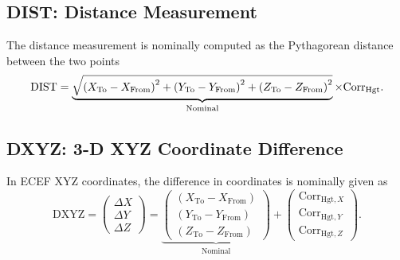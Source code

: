\subsection{DIST: Distance Measurement} \label{subsection:DIST}
The distance measurement is nominally computed as the Pythagorean distance between the two points
\begin{equation}
\text{DIST} = \underbrace{\sqrt{\left(X_{\text{To}}-X_{\text{From}}\right)^2+\left(Y_{\text{To}}-Y_{\text{From}}\right)^2+\left(Z_{\text{To}}-Z_{\text{From}}\right)^2}}_{\text{Nominal}}\times\text{Corr}_{\text{\text{Hgt}}}.
\end{equation}
\subsection{DXYZ: 3-D XYZ Coordinate Difference} \label{subsection:DXYZ}
In ECEF XYZ coordinates, the difference in coordinates is nominally given as
\begin{equation}
\text{DXYZ}=\left(\begin{array}{c}\Delta X\\\Delta Y\\\Delta Z\end{array}\right) = \underbrace{\left(\begin{array}{c}\left(X_{\text{To}}-X_{\text{From}}\right)\\\left(Y_{\text{To}}-Y_{\text{From}}\right)\\\left(Z_{\text{To}}-Z_{\text{From}}\right)\end{array}\right)}_{\text{Nominal}}+\left(\begin{array}{c}\text{Corr}_{\text{Hgt},X}\\\text{Corr}_{\text{Hgt},Y}\\\text{Corr}_{\text{Hgt},Z}\end{array}\right).
\end{equation}
